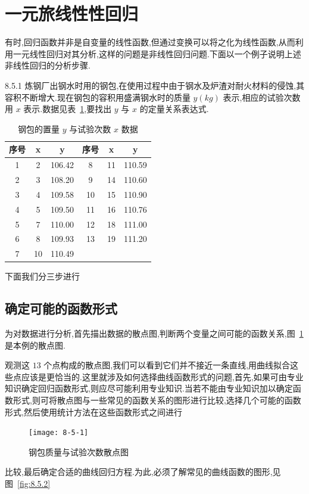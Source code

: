 \section{一元旅线性性回归}\label{sec:8.5}

有时,回归函数并非是自变量的线性函数,但通过变换可以将之化为线性函数,从而利用一元线性回归对其分析,这样的问题是非线性回归问题.下面以一个例子说明上述非线性回归的分析步骤.
\begin{example}{}{8.5.1}
	炼钢厂出钢水时用的钢包,在使用过程中由于钢水及炉渣对耐火材料的侵蚀,其容积不断增大.现在钢包的容积用盛满钢水时的质量 $ y(kg) $ 表示,相应的试验次数用 $ x $ 表示.数据见表~\ref{tab:8.5.1},要找出 $ y $ 与 $ x $ 的定量关系表达式.
	\begin{table}[htbp]
		\centering
		\caption{钢包的置量 $ y $ 与试验次数 $ x $ 数据}
		\begin{tabular}{ccc||ccc}
			\toprule
			序号    & x     & y     & 序号    & x     & y \\\midrule
			1     & 2     & 106.42  & 8     & 11    & 110.59  \\
			2     & 3     & 108.20  & 9     & 14    & 110.60  \\
			3     & 4     & 109.58  & 10    & 15    & 110.90  \\
			4     & 5     & 109.50  & 11    & 16    & 110.76  \\
			5     & 7     & 110.00  & 12    & 18    & 111.00  \\
			6     & 8     & 109.93  & 13    & 19    & 111.20  \\
			7     & 10    & 110.49  &       &       &  \\\bottomrule
		\end{tabular}%
		\label{tab:8.5.1}%
	\end{table}%
	下面我们分三步进行
	
	\subsection{确定可能的函数形式}
	
	为对数据进行分析,首先描出数据的散点图,判断两个变量之间可能的函数关系,图~\ref{fig:8.5.1}是本例的散点图.
	
	观测这 $ 13 $ 个点构成的散点图,我们可以看到它们并不接近一条直线,用曲线拟合这些点应该是更恰当的.这里就涉及如何选择曲线函数形式的问题,首先,如果可由专业知识确定回归函数形式,则应尽可能利用专业知识.当若不能由专业知识加以确定函数形式,则可将散点图与一些常见的函数关系的图形进行比较,选择几个可能的函数形式,然后使用统计方法在这些函数形式之间进行
	\begin{figure}[hb]
		\centering
		\texttt{[image: 8-5-1]}
		\caption{钢包质量与试验次数散点图}
		\label{fig:8.5.1}
	\end{figure}
	比较,最后确定合适的曲线回归方程.为此,必须了解常见的曲线函数的图形,见图~\ref{fig:8.5.2}
	

\end{example}
